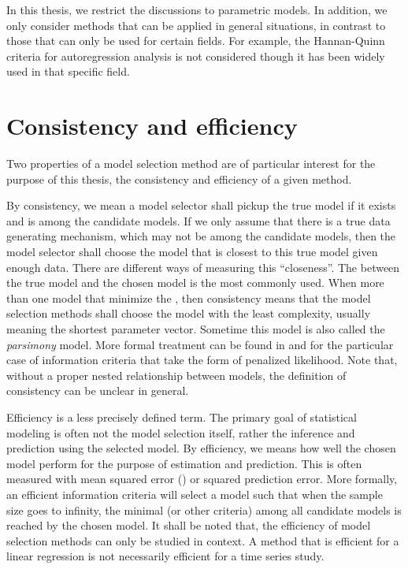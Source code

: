 In this thesis, we restrict the discussions to parametric models. In addition,
we only consider methods that can be applied in general situations, in
contrast to those that can only be used for certain fields. For example, the
Hannan-Quinn \cite{Hannan:1979us} criteria for autoregression analysis is not
considered though it has been widely used in that specific field.

\section{Consistency and efficiency}
\label{sec:Consistency and efficiency}

Two properties of a model selection method are of particular interest for the
purpose of this thesis, the consistency and efficiency of a given method.

By consistency, we mean a model selector shall pickup the true model if it
exists and is among the candidate models. If we only assume that there is a
true data generating mechanism, which may not be among the candidate models,
then the model selector shall choose the model that is closest to this true
model given enough data. There are different ways of measuring this
``closeness''. The \kl \cite{Kullback:1951va} between the true model and the
chosen model is the most commonly used. When more than one model that minimize
the \kl, then consistency means that the model selection methods shall choose
the model with the least complexity, usually meaning the shortest parameter
vector. Sometime this model is also called the \emph{parsimony} model. More
formal treatment can be found in \cite{Sin:1996vs} and \cite[][sec.~4.1
and~4.3]{Claeskens:2008tq} for the particular case of information criteria
that take the form of penalized likelihood. Note that, without a proper nested
relationship between models, the definition of consistency can be unclear in
general.

Efficiency is a less precisely defined term. The primary goal of statistical
modeling is often not the model selection itself, rather the inference and
prediction using the selected model. By efficiency, we means how well the
chosen model perform for the purpose of estimation and prediction. This is
often measured with mean squared error (\mse) or squared prediction error.
More formally, an efficient information criteria will select a model such that
when the sample size goes to infinity, the minimal \mse (or other criteria)
among all candidate models is reached by the chosen model. It shall be noted
that, the efficiency of model selection methods can only be studied in
context. A method that is efficient for a linear regression is not necessarily
efficient for a time series study.


